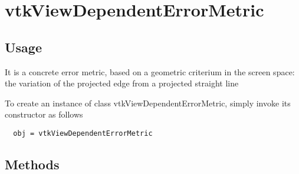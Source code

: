\section{vtkViewDependentErrorMetric}

\subsection{Usage}

 It is a concrete error metric, based on a geometric criterium in 
 the screen space: the variation of the projected edge from a projected 
 straight line


To create an instance of class vtkViewDependentErrorMetric, simply
invoke its constructor as follows
\begin{verbatim}
  obj = vtkViewDependentErrorMetric
\end{verbatim}
\subsection{Methods}

